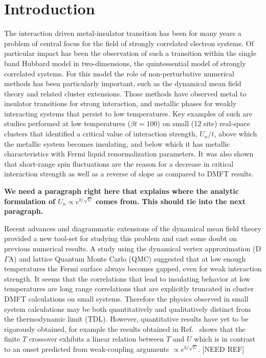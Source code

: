 \documentclass[twocolumn,notitlepage,prl,superscriptaddress,showpacs]{revtex4-1}
\begin{document}
\section{Introduction}

 The interaction driven metal-insulator transition has been for many years a problem of central focus for the field of strongly correlated electron systems.\cite{park:2008,georges:1996} Of particular impact has been the observation of such a transition within the single band Hubbard model in two-dimensions, the quintessential model of strongly correlated systems.\cite{schaefer:2015,  benchmark:2015}
For this model the role of non-perturbative numerical methods has been particularly important, such as the dynamical mean field theory and related cluster extensions.\cite{Maier05,georges:1996}  Those methods have observed metal to insulator transitions for strong interaction, and metallic phases for weakly interacting systems that persist to low temperatures. Key examples of such are studies performed at low temperatures ($\beta t=100$) on small (12 site) real-space clusters\cite{park:2008} that identified a critical value of interaction strength, $U_n/t$, above which the metallic system becomes insulating, and below which it has metallic characteristics with Fermi liquid renormalization parameters. It was also shown that short-range spin fluctuations are the reason for a decrease in critical interaction strength as well as a reverse of slope as compared to DMFT results.

\textbf{We need a paragraph right here that explains where the analytic formulation of $U_n\propto e^{b/\sqrt{U}}$ comes from. This should tie into the next paragraph.} 

 Recent advances and diagrammatic extensions of the dynamical mean field theory
provided a new tool-set for studying this problem and cast some doubt on previous numerical results.\cite{schaefer:2015,vanloon:2018} A study using the dynamical vertex approximation  (D$\Gamma$A) and lattice Quantum Monte Carlo (QMC) \cite{schaefer:2015} suggested that at low enough temperatures the Fermi surface always becomes gapped, even for weak interaction strength. It seems that the correlations that lead to insulating behavior at low temperatures are long range correlations that are explicitly truncated in cluster DMFT calculations on small systems. Therefore the physics observed in small system calculations may be both quantitatively and qualitatively distinct from the thermodynamic limit (TDL).\cite{benchmark:2015} However, quantitative results have yet to be rigorously obtained, for example the results obtained in Ref.~\cite{schaefer:2015} shows that the finite $T$ crossover exhibits a linear relation between $T$ and $U$ which is in contrast to an onset predicted from weak-coupling arguments $\propto e^{b/\sqrt{U}}$. [NEED REF]
\end{document}
